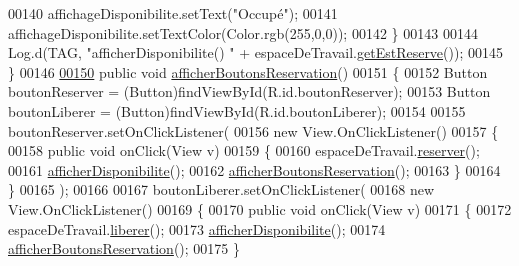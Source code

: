 \begin{DoxyCode}
00140             affichageDisponibilite.setText(\textcolor{stringliteral}{"Occupé"});
00141             affichageDisponibilite.setTextColor(Color.rgb(255,0,0));
00142         \}
00143 
00144         Log.d(TAG, \textcolor{stringliteral}{"afficherDisponibilite() "} + espaceDeTravail.\hyperlink{classcom_1_1lasalle_1_1meeting_1_1_espace_de_travail_a69fe30f8d3aff92986f4c39402e16ab0}{getEstReserve}());
00145     \}
00146 
\hyperlink{classcom_1_1lasalle_1_1meeting_1_1_affichage_espace_de_travail_a01e3d2585c84043dbe5086a2fc81c371}{00150}     \textcolor{keyword}{public} \textcolor{keywordtype}{void} \hyperlink{classcom_1_1lasalle_1_1meeting_1_1_affichage_espace_de_travail_a01e3d2585c84043dbe5086a2fc81c371}{afficherBoutonsReservation}()
00151     \{
00152         Button boutonReserver = (Button)findViewById(R.id.boutonReserver);
00153         Button boutonLiberer = (Button)findViewById(R.id.boutonLiberer);
00154 
00155         boutonReserver.setOnClickListener(
00156                 \textcolor{keyword}{new} View.OnClickListener()
00157                 \{
00158                     \textcolor{keyword}{public} \textcolor{keywordtype}{void} onClick(View v)
00159                     \{
00160                         espaceDeTravail.\hyperlink{classcom_1_1lasalle_1_1meeting_1_1_espace_de_travail_a42d483a68e6d0d50707dbd3dddd164c2}{reserver}();
00161                         \hyperlink{classcom_1_1lasalle_1_1meeting_1_1_affichage_espace_de_travail_a597703fc6f7e82b79ac7047640fa9323}{afficherDisponibilite}();
00162                         \hyperlink{classcom_1_1lasalle_1_1meeting_1_1_affichage_espace_de_travail_a01e3d2585c84043dbe5086a2fc81c371}{afficherBoutonsReservation}();
00163                     \}
00164                 \}
00165         );
00166 
00167         boutonLiberer.setOnClickListener(
00168                 \textcolor{keyword}{new} View.OnClickListener()
00169                 \{
00170                     \textcolor{keyword}{public} \textcolor{keywordtype}{void} onClick(View v)
00171                     \{
00172                         espaceDeTravail.\hyperlink{classcom_1_1lasalle_1_1meeting_1_1_espace_de_travail_affce017a0a5ba338d7b0b7f6bbce6c68}{liberer}();
00173                         \hyperlink{classcom_1_1lasalle_1_1meeting_1_1_affichage_espace_de_travail_a597703fc6f7e82b79ac7047640fa9323}{afficherDisponibilite}();
00174                         \hyperlink{classcom_1_1lasalle_1_1meeting_1_1_affichage_espace_de_travail_a01e3d2585c84043dbe5086a2fc81c371}{afficherBoutonsReservation}();
00175                     \}

\end{DoxyCode}
